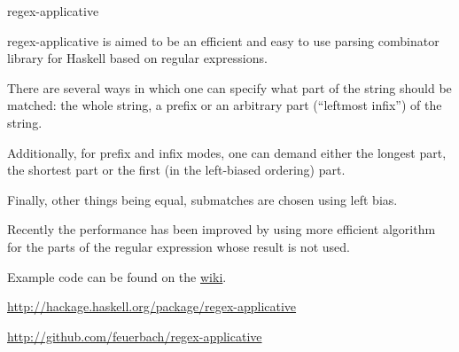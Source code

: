\begin{hcarentry}[updated]{regex-applicative}
\makeheader

regex-applicative is aimed to be an efficient and easy to use parsing combinator
library for Haskell based on regular expressions.

There are several ways in which one can specify what part of the string should
be matched: the whole string, a prefix or an arbitrary part (``leftmost infix'')
of the string.

Additionally, for prefix and infix modes, one can demand either
the longest part, the shortest part or the first (in the left-biased ordering)
part.

Finally, other things being equal, submatches are chosen using left bias.

Recently the performance has been improved by using more efficient algorithm for
the parts of the regular expression whose result is not used.

\noindent
Example code can be found on the
\href{https://github.com/feuerbach/regex-applicative/wiki/Examples}
{wiki}.

\FurtherReading
\begin{compactitem}
  \item \url{http://hackage.haskell.org/package/regex-applicative}
  \item \url{http://github.com/feuerbach/regex-applicative}
\end{compactitem}
\end{hcarentry}
